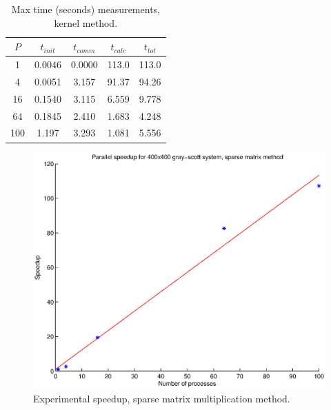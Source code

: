 \documentclass[a4paper,11pt]{article}
\begin{document}
\begin{table}[h]
\def\arraystretch{1.2}
\begin{center}
\caption{Max time (seconds) measurements, kernel method.}
\label{tab:kernal}
\begin{tabular}{| c | c | c | c | c |}
\hline
$P$ & $t_{init}$ & $t_{comm}$ & $t_{calc}$ & $t_{tot}$ \\
\hline
1 & 0.0046 & 0.0000 &113.0 &113.0\\
\hline
4 & 0.0051& 3.157 & 91.37 & 94.26\\
\hline
16 & 0.1540 & 3.115 & 6.559 & 9.778\\
\hline
64 & 0.1845 & 2.410 &1.683 &4.248 \\
\hline
100 &1.197 & 3.293 & 1.081 & 5.556 \\
\hline
\end{tabular}
\end{center}
\end{table}

\begin{figure}
  \centering
  \includegraphics[scale=0.6]{sparse}
    \caption{Experimental speedup, sparse matrix multiplication method.}
    \label{fig:sparse}
\end{figure}
\end{document}
